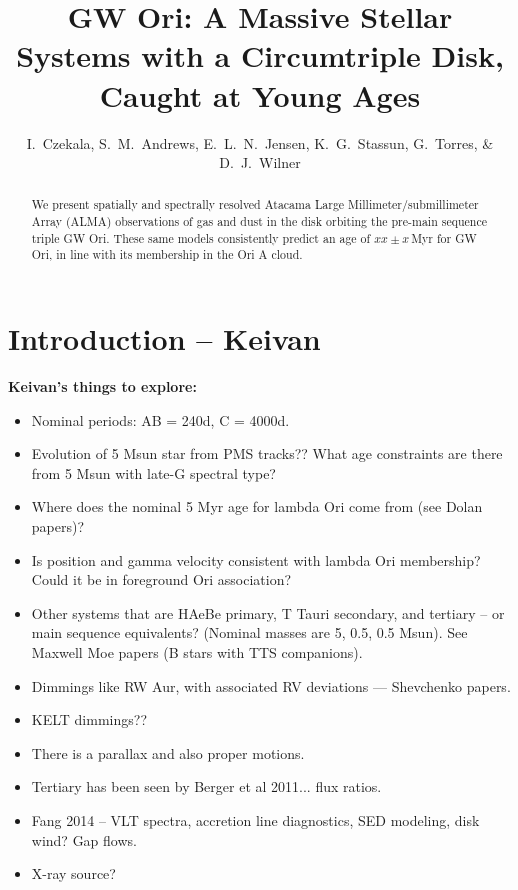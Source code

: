 \documentclass{aastex6}
\begin{document}
\title{GW Ori: A Massive Stellar Systems with a Circumtriple Disk, Caught at Young Ages}
\author{I.~Czekala, S.~M.~Andrews, E.~L.~N.~Jensen, K.~G.~Stassun, G.~Torres, \& D.~J.~Wilner}



\begin{abstract}
We present spatially and spectrally resolved Atacama Large Millimeter/submillimeter Array (ALMA) observations of gas and dust in the disk orbiting the pre-main sequence triple GW Ori. These same models consistently predict an age of $xx\pm x$\,Myr for GW Ori, in line with its membership in the Ori A cloud. 
\end{abstract}


\section{Introduction -- {\bf Keivan} \label{sec:intro}}

\noindent
{\bf Keivan's things to explore:}
\begin{itemize}
\item Nominal periods: AB = 240d, C = 4000d.
\item Evolution of 5 Msun star from PMS tracks?? What age constraints are there from 5 Msun with late-G spectral type?
\item Where does the nominal 5 Myr age for lambda Ori come from (see Dolan papers)? 
\item Is position and gamma velocity consistent with lambda Ori membership? Could it be in foreground Ori association? 
\item Other systems that are HAeBe primary, T Tauri secondary, and tertiary -- or main sequence equivalents? (Nominal masses are 5, 0.5, 0.5 Msun). See Maxwell Moe papers (B stars with TTS companions).
\item Dimmings like RW Aur, with associated RV deviations --- Shevchenko papers. 
\item KELT dimmings??
\item There is a parallax and also proper motions. 
\item Tertiary has been seen by Berger et al 2011... flux ratios.
\item Fang 2014 -- VLT spectra, accretion line diagnostics, SED modeling, disk wind? Gap flows.
\item X-ray source?
\end{itemize}
\end{document}
